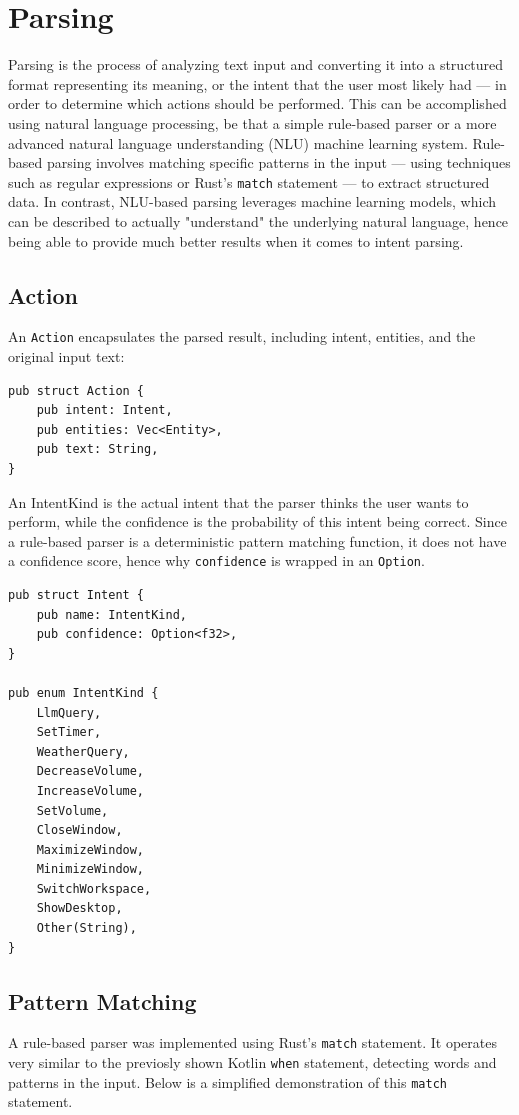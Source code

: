 \section{Parsing}
Parsing is the process of analyzing text input and converting it
into a structured format representing its meaning, or the intent that the user most likely had ---
in order to determine which actions should be performed.
This can be accomplished using natural language processing,
be that a simple rule-based parser or a more advanced natural language understanding (NLU) machine learning system.
Rule-based parsing involves matching specific patterns in the input ---
using techniques such as regular expressions or Rust's \texttt{match} statement --- to extract structured data.
In contrast, NLU-based parsing leverages machine learning models, which can be described to actually "understand"
the underlying natural language, hence being able to provide much better results when it comes to intent parsing.

\subsection{Action}
An \texttt{Action} encapsulates the parsed result, including intent, entities, and the original input text:

\begin{verbatim}
pub struct Action {
    pub intent: Intent,
    pub entities: Vec<Entity>,
    pub text: String,
}
\end{verbatim}

An IntentKind is the actual intent that the parser thinks the user wants to perform, while the confidence
is the probability of this intent being correct. Since a rule-based parser is a deterministic pattern matching function,
it does not have a confidence score, hence why \texttt{confidence} is wrapped in an \texttt{Option}.

\begin{verbatim}
pub struct Intent {
    pub name: IntentKind,
    pub confidence: Option<f32>,
}

pub enum IntentKind {
    LlmQuery,
    SetTimer,
    WeatherQuery,
    DecreaseVolume,
    IncreaseVolume,
    SetVolume,
    CloseWindow,
    MaximizeWindow,
    MinimizeWindow,
    SwitchWorkspace,
    ShowDesktop,
    Other(String),
}
\end{verbatim}

\subsection{Pattern Matching}
A rule-based parser was implemented using Rust's \texttt{match} statement.
It operates very similar to the previosly shown Kotlin \texttt{when} statement, detecting words and patterns in the input.
Below is a simplified demonstration of this \texttt{match} statement.

